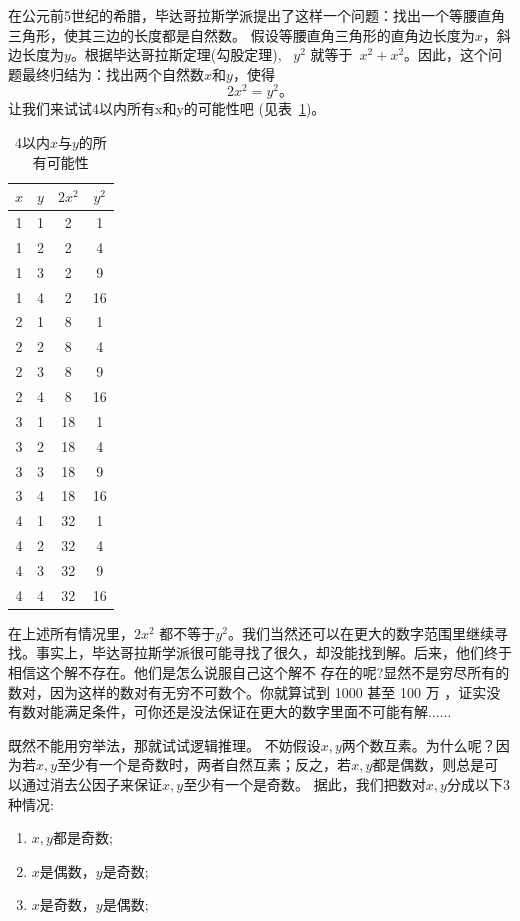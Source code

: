 在公元前5世纪的希腊，毕达哥拉斯学派提出了这样一个问题：找出一个等腰直角三角形，使其三边的长度都是自然数。
假设等腰直角三角形的直角边长度为$x$，斜边长度为$y$。根据毕达哥拉斯定理(勾股定理), ~$y^2$ 就等于~$x^2+x^2$。因此，这个问题最终归结为：找出两个自然数$x$和$y$，使得
\begin{equation}\label{eqn}
2x^2=y^2。
\end{equation}
让我们来试试4以内所有x和y的可能性吧 (见表~\ref{tab:example})。
\begin{table}[htbp]
\centering
\begin{tabular}{|c|c|c|c|}
\hline
$x$ & $y$ & $2x^2$ & $y^2$ \\
\hline
1 & 1 & 2 & 1 \\
\hline
1 & 2 & 2 & 4 \\
\hline
1 & 3 & 2 & 9 \\
\hline
1 & 4 & 2 & 16 \\
\hline
2 & 1 & 8 & 1 \\
\hline
2 & 2 & 8 & 4 \\
\hline
2 & 3 & 8 & 9 \\
\hline
2 & 4 & 8 & 16 \\
\hline
3 & 1 & 18 & 1 \\
\hline
3 & 2 & 18 & 4 \\
\hline
3 & 3 & 18 & 9 \\
\hline
3 & 4 & 18 & 16 \\
\hline
4 & 1 & 32 & 1 \\
\hline
4 & 2 & 32 & 4 \\
\hline
4 & 3 & 32 & 9 \\
\hline
4 & 4 & 32 & 16 \\
\hline
\end{tabular}
\caption{4以内$x$与$y$的所有可能性}
\label{tab:example}
\end{table}
在上述所有情况里，$2x^2$ 都不等于$y^2$。我们当然还可以在更大的数字范围里继续寻找。事实上，毕达哥拉斯学派很可能寻找了很久，却没能找到解。后来，他们终于相信这个解不存在。他们是怎么说服自己这个解不 存在的呢?显然不是穷尽所有的数对，因为这样的数对有无穷不可数个。你就算试到 1000 甚至 100 万 ，证实没有数对能满足条件，可你还是没法保证在更大的数字里面不可能有解......

既然不能用穷举法，那就试试逻辑推理。 
不妨假设$x,y$两个数互素。为什么呢？因为若$x,y$至少有一个是奇数时，两者自然互素；反之，若$x,y$都是偶数，则总是可以通过消去公因子来保证$x,y$至少有一个是奇数。
据此，我们把数对$x,y$分成以下3种情况: 
\begin{enumerate}
\item $x,y$都是奇数;
\item $x$是偶数，$y$是奇数;
\item $x$是奇数，$y$是偶数;
\end{enumerate}

